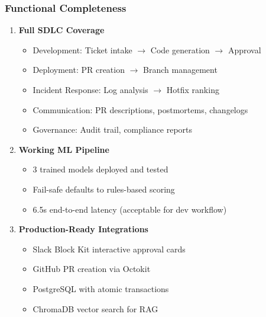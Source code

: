 \documentclass[11pt,a4paper]{article}
\begin{document}
\subsubsection{Functional Completeness}
\begin{enumerate}
    \item \textbf{Full SDLC Coverage}
    \begin{itemize}
        \item Development: Ticket intake $\rightarrow$ Code generation $\rightarrow$ Approval
        \item Deployment: PR creation $\rightarrow$ Branch management
        \item Incident Response: Log analysis $\rightarrow$ Hotfix ranking
        \item Communication: PR descriptions, postmortems, changelogs
        \item Governance: Audit trail, compliance reports
    \end{itemize}
    
    \item \textbf{Working ML Pipeline}
    \begin{itemize}
        \item 3 trained models deployed and tested
        \item Fail-safe defaults to rules-based scoring
        \item 6.5s end-to-end latency (acceptable for dev workflow)
    \end{itemize}
    
    \item \textbf{Production-Ready Integrations}
    \begin{itemize}
        \item Slack Block Kit interactive approval cards
        \item GitHub PR creation via Octokit
        \item PostgreSQL with atomic transactions
        \item ChromaDB vector search for RAG
    \end{itemize}
\end{enumerate}
\end{document}
